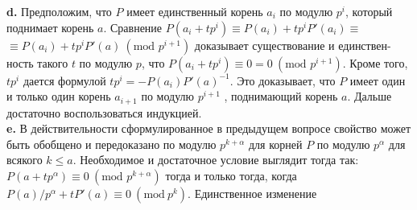 \hspace*{15pt}\textbf{d.} Предположим, что $P$ имеет единственный корень $a_i$ по модулю $p^i$,\linebreak
который поднимает корень $a$. Сравнение $P(a_i+tp^i)\equiv P(a_i)+tp^i P'(a_i)\equiv$\linebreak
$\equiv P(a_i)+tp^iP'(a)~(\text{mod }p^{i+1})$ доказывает существование и единствен-\linebreak
ность такого $t$ по модулю $p$, что $P(a_i+tp^i)\equiv0 = 0 ~(\text{mod }p^{i+1})$. Кроме\linebreak
того, $tp^i$ дается формулой $tp^i=-P(a_i)P'(a)^{-1}$. Это доказывает, что $P$\linebreak
имеет один и только один корень $a_{i+1}$ по модулю $p^{i+1}$ , поднимающий\linebreak
корень $a$. Дальше достаточно воспользоваться индукцией.\newline
\\
\hspace*{15pt}\textbf{e.} В действительности сформулированное в предыдущем вопросе\linebreak
свойство может быть обобщено и передоказано по модулю $p^{k+\alpha}$ для\linebreak
корней $P$ по модулю $p^\alpha$ для всякого $k\leqslant a$. Необходимое и достаточное\linebreak
условие выглядит тогда так: $P(a+tp^\alpha)\equiv 0~(\text{mod }p^{k+\alpha})$ тогда и только\linebreak
тогда, когда $P(a)/p^\alpha+tP'(a)\equiv0~(\text{mod}~p^k)$. Единственное изменение\linebreak

\pagebreak